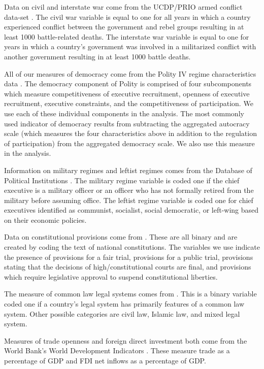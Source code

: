 \documentclass[12pt]{article}
\begin{document}
Data on civil and interstate war come from the UCDP/PRIO armed conflict data-set \citep{ThemnerWallensteen2012}. The civil war variable is equal to one for all years in which a country experienced conflict between the government and rebel groups resulting in at least 1000 battle-related deaths. The interstate war variable is equal to one for years in which a country's government was involved in a militarized conflict with another government resulting in at least 1000 battle deaths.

All of our measures of democracy come from the Polity IV regime characteristics data \citep{MarshallJaggers2009}. The democracy component of Polity is comprised of four subcomponents which measure competitiveness of executive recruitment, openness of executive recruitment, executive constraints, and the competitiveness of participation. We use each of these individual components in the analysis. The most commonly used indicator of democracy results from subtracting the aggregated autocracy scale (which measures the four characteristics above in addition to the regulation of participation) from the aggregated democracy scale. We also use this measure in the analysis.  

Information on military regimes and leftist regimes comes from the Database of Political Institutions \citep{beck2001new}. The military regime variable is coded one if the chief executive is a military officer or an officer who has not formally retired from the military before assuming office. The leftist regime variable is coded one for chief executives identified as communist, socialist, social democratic, or left-wing based on their economic policies. 

Data on constitutional provisions come from \citet{KeithTatePoe2009}. These are all binary and are created by 
coding the text of national constitutions. The variables we use indicate the presence of provisions for a fair trial, provisions for a public trial, provisions stating that the decisions of high/constitutional courts are final, and provisions which require legislative approval to suspend constitutional liberties. 

The measure of common law legal systems comes from \citet{powell2007international}. This is a binary variable coded one if a country's legal system has primarily features of a common law system. Other possible categories are civil law, Islamic law, and mixed legal system.

Measures of trade openness and foreign direct investment both come from the World Bank's World Development Indicators \citep{WorldBank2012}. These measure trade as a percentage of GDP and FDI net inflows as a percentage of GDP. 
\end{document}
